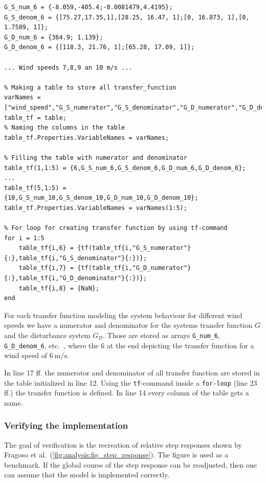 \begin{lstlisting}[style=Matlab-editor,caption={},captionpos=b,label={list:analysis:tf}]
% Wind speed: 6 m/s
G_S_num_6 = {-8.059,-405.4;-0.0081479,4.4195};
G_S_denom_6 = {[75.27,17.35,1],[28.25, 16.47, 1];[0, 16.873, 1],[0, 1.7589, 1]};
G_D_num_6 = {364.9; 1.139};
G_D_denom_6 = {[118.3, 21.76, 1];[65.28, 17.09, 1]};

... Wind speeds 7,8,9 an 10 m/s ...

% Making a table to store all transfer_function
varNames = ["wind_speed","G_S_numerator","G_S_denominator","G_D_numerator","G_D_denominator","G_S","G_D","RGA"];
table_tf = table;
% Naming the columns in the table
table_tf.Properties.VariableNames = varNames;

% Filling the table with numerator and denominator
table_tf(1,1:5) = {6,G_S_num_6,G_S_denom_6,G_D_num_6,G_D_denom_6};
...
table_tf(5,1:5) = {10,G_S_num_10,G_S_denom_10,G_D_num_10,G_D_denom_10};
table_tf.Properties.VariableNames = varNames(1:5);

% For loop for creating transfer function by using tf-command
for i = 1:5
    table_tf{i,6} = {tf(table_tf{i,"G_S_numerator"}{:},table_tf{i,"G_S_denominator"}{:})};
    table_tf{i,7} = {tf(table_tf{i,"G_D_numerator"}{:},table_tf{i,"G_D_denominator"}{:})};
    table_tf{i,8} = {NaN};
end
\end{lstlisting}

For each transfer function modeling the system behaviour for different wind speeds we have a numerator and denominator for the systems transfer function $G$ and the disturbance system $G_D$.
Those are stored as arrays \texttt{G\_num\_6}, \texttt{G\_D\_denom\_6}, etc.~, where the 6 at the end depicting the transfer function for a wind speed of $\SI{6}{\metre \per \second}$.

In line 17 ff. the numerator and denominator of all transfer function are stored in the table initialized in line 12.
Using the \texttt{tf}-command inside a \texttt{for-loop} (line 23 ff.) the transfer function is defined.
In line 14 every column of the table gets a name.

\subsubsection{Verifying the implementation}

The goal of verification is the recreation of relative step responses shown by Fragoso et al.~(\autoref{fig:analysis:fig_step_response}).
The figure is used as a benchmark.
If the global course of the step response can be readjusted, then one can assume that the model is implemented correctly.


